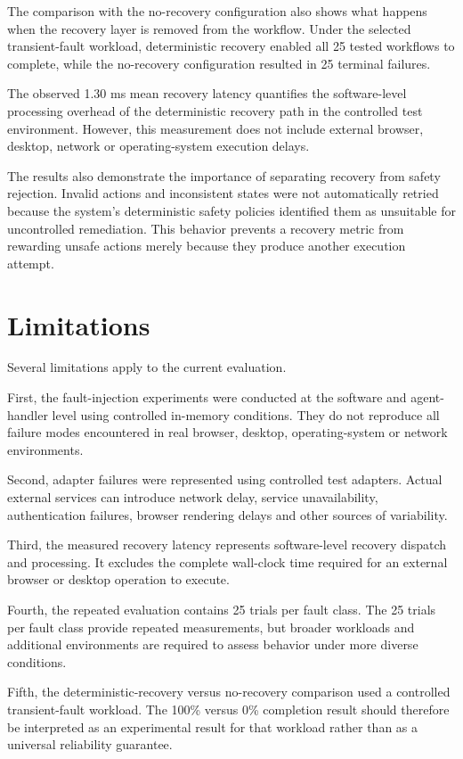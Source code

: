 \documentclass[conference]{IEEEtran}
\begin{document}
The comparison with the no-recovery configuration also shows what happens when the recovery layer is removed from the workflow. Under the selected transient-fault workload, deterministic recovery enabled all 25 tested workflows to complete, while the no-recovery configuration resulted in 25 terminal failures.

The observed 1.30 ms mean recovery latency quantifies the software-level processing overhead of the deterministic recovery path in the controlled test environment. However, this measurement does not include external browser, desktop, network or operating-system execution delays.

The results also demonstrate the importance of separating recovery from safety rejection. Invalid actions and inconsistent states were not automatically retried because the system's deterministic safety policies identified them as unsuitable for uncontrolled remediation. This behavior prevents a recovery metric from rewarding unsafe actions merely because they produce another execution attempt.

\section{Limitations}
Several limitations apply to the current evaluation.

First, the fault-injection experiments were conducted at the software and agent-handler level using controlled in-memory conditions. They do not reproduce all failure modes encountered in real browser, desktop, operating-system or network environments.

Second, adapter failures were represented using controlled test adapters. Actual external services can introduce network delay, service unavailability, authentication failures, browser rendering delays and other sources of variability.

Third, the measured recovery latency represents software-level recovery dispatch and processing. It excludes the complete wall-clock time required for an external browser or desktop operation to execute.

Fourth, the repeated evaluation contains 25 trials per fault class. The 25 trials per fault class provide repeated measurements, but broader workloads and additional environments are required to assess behavior under more diverse conditions.

Fifth, the deterministic-recovery versus no-recovery comparison used a controlled transient-fault workload. The 100\% versus 0\% completion result should therefore be interpreted as an experimental result for that workload rather than as a universal reliability guarantee.
\end{document}
